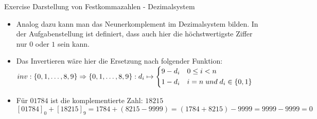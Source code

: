 \begin{frame}[allowframebreaks]{Exercise \thesection}{Darstellung von Festkommazahlen - Dezimalsystem}
\begin{solutionnoinc}
\begin{itemize}
invertiert.
      \item Analog dazu kann man das Neunerkomplement im Dezimalsystem bilden. In der Aufgabenstellung ist definiert, dass auch hier die höchstwertigste Ziffer nur $0$ oder $1$ sein kann. 
      \item Das Invertieren wäre hier die Ersetzung nach folgender Funktion:\\[0.25cm] $inv : \{0, 1, \ldots, 8, 9\} \Rightarrow \{0, 1, \ldots, 8, 9\} : d_i \mapsto \begin{dcases}
          9-d_i & 0\le i < n \\
          1-d_i & i = n\;und\;d_i\in\{0, 1\}
        \end{dcases}
        $
      \item Für $01784$ ist die komplementierte Zahl: $18215$\\[0.25cm]
        $[01784]_{0}+[18215]_{9}=1784+(8215-9999)=(1784+8215)-9999=9999-9999=0$
    \end{itemize}
  \end{solutionnoinc}
\end{frame}
